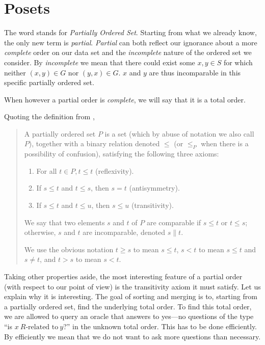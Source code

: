 \section{Posets}

The word  stands for \emph{Partially Ordered Set}. Starting from
what we already know, the only new term is \emph{partial}. \emph{Partial} can
both reflect our ignorance about a more \emph{complete} order on our data set
and the \emph{incomplete} nature of the ordered set we consider. By
\emph{incomplete} we mean that there could exist some $x, y \in S$ for which
neither $(x, y) \in G$ nor $(y, x) \in G$. $x$ and $y$ are thus incomparable in
this specific partially ordered set.


When however a partial order is \emph{complete}, we will say that it is a total
order.

Quoting the definition from \cite{Stanley:2011:ECV:2124415},

\begin{quotation}

A partially ordered set $P$ is a set (which by abuse of notation we also call
$P$), together with a binary relation denoted $\leq$ (or $\leq_P$ when there is
a possibility of confusion), satisfying the following three axioms:

\begin{enumerate}
\item For all $t \in P, t \leq t$ (reflexivity).
\item If $s \leq t$ and $t \leq s$, then $s = t$ (antisymmetry).
\item If $s \leq t$ and $t \leq u$, then $s \leq u$ (transitivity).
\end{enumerate}

We say that two elements $s$ and $t$ of $P$ are comparable if $s \leq t$ or $t
\leq s$; otherwise, $s$ and $t$ are incomparable, denoted $s \parallel t$.

We use the obvious notation $t \geq s$ to mean $s \leq t$, $s < t$ to mean $s
\leq t$ and $s \neq t$, and $t > s$ to mean $s < t$.

\end{quotation}

Taking other properties aside, the most interesting feature of a partial order
(with respect to our point of view) is the transitivity axiom it must satisfy.
Let us explain why it is interesting. The goal of sorting and merging is to,
starting from a partially ordered set, find the underlying total order. To find
this total order, we are allowed to query an oracle that answers to yes---no
questions of the type ``is $x~R\text{-related to}~y$?'' in the unknown total
order. This has to be done efficiently. By efficiently we mean that we do not
want to ask more questions than necessary.

